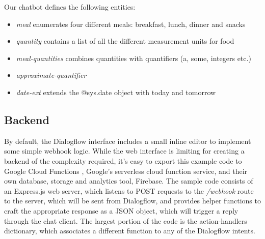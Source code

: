 Our chatbot defines the following entities:
\begin{itemize}
  \item \textit{meal} enumerates four different meals: breakfast, lunch, dinner and snacks
  \item \textit{quantity} contains a list of all the different measurement units for food
  \item \textit{meal-quantities} combines quantities with quantifiers (a, some, integers etc.)
  \item \textit{approximate-quantifier}
  \item \textit{date-ext} extends the @sys.date object with today and tomorrow
\end{itemize}

\subsection*{Backend}
By default, the Dialogflow interface includes a small inline editor to implement some simple webhook logic. While the web interface is limiting for creating a backend of the complexity required, it's easy to export this example code to Google Cloud Functions \cite{gcfwebsite}, Google's serverless cloud function service, and their own database, storage and analytics tool, Firebase. 
The sample code consists of an Express.js \cite{expresswebsite} web server, which listens to POST requests to the \textit{/webhook} route to the server, which will be sent from Dialogflow, and provides helper functions to craft the appropriate response as a JSON object, which will trigger a reply through the chat client. The largest portion of the code is the action-handlers dictionary, which associates a different function to any of the Dialogflow intents. \\

